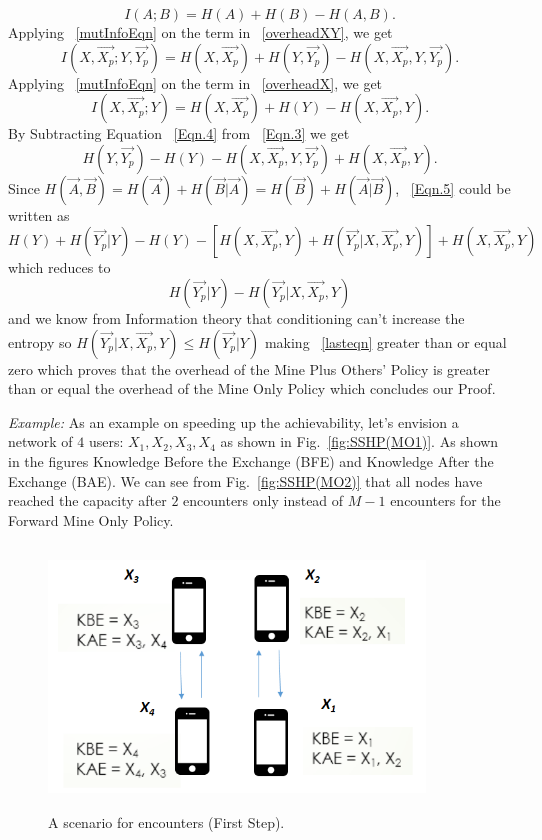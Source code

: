 \documentclass[11pt]{article}
\begin{document}
\begin{itemize}
\begin{equation} 
I(A;B)=H(A) + H(B) - H(A,B).
\label{mutInfoEqn}
\end{equation}
Applying ~\eqref{mutInfoEqn} on the term in ~\eqref{overheadXY}, we get
\begin{equation}
I(X,\vec{X_p};Y,\vec{Y_p})= H(X,\vec{X_p})+H(Y,\vec{Y_p})-H(X,\vec{X_p},Y,\vec{Y_p}).
\label{Eqn.3}
\end{equation}
Applying ~\eqref{mutInfoEqn} on the term in ~\eqref{overheadX}, we get
\begin{equation}
I(X,\vec{X_p};Y)= H(X,\vec{X_p})+H(Y)-H(X,\vec{X_p},Y).
\label{Eqn.4}
\end{equation}
By Subtracting Equation ~\eqref{Eqn.4} from ~\eqref{Eqn.3} we get 
\begin{equation}
H(Y,\vec{Y_p})-H(Y)-H(X,\vec{X_p},Y,\vec{Y_p})+H(X,\vec{X_p},Y).
\label{Eqn.5}
\end{equation}
Since $H(\vec{A},\vec{B}) = H(\vec{A}) + H(\vec{B}|\vec{A}) = H(\vec{B}) + H(\vec{A}|\vec{B}) $, ~\eqref{Eqn.5} could be written as
\begin{equation}
H(Y)+H(\vec{Y_p}|Y)-H(Y)-[H(X,\vec{X_p},Y) + H(\vec{Y_p}|X,\vec{X_p},Y)] + H(X,\vec{X_p},Y)
\end{equation}
which reduces to 
\begin{equation}
H(\vec{Y_p}|Y)- H(\vec{Y_p}|X,\vec{X_p},Y)
\label{lasteqn}
\end{equation}
and we know from Information theory that conditioning can't increase the entropy so $H(\vec{Y_p}|X,\vec{X_p},Y) \leq H(\vec{Y_p}|Y)$ making ~\eqref{lasteqn} greater than or equal zero which proves that the overhead of the Mine Plus Others' Policy is greater than or equal the overhead of the Mine Only Policy which concludes our Proof.

\end{itemize}
\textit{Example: }As an example on speeding up the achievability, let's envision a network of $4$ users: $X_1, X_2, X_3, X_4$ as shown in Fig.~\ref{fig:SSHP(MO1)}. As shown in the figures Knowledge Before the Exchange (BFE) and Knowledge After the Exchange (BAE). We can see from Fig.~\ref{fig:SSHP(MO2)} that all nodes have reached the capacity after $2$ encounters only instead of $M-1$ encounters for the Forward Mine Only Policy.
\begin{figure}[!bp]
\centering
    \includegraphics[width=10cm ,height=7cm]{figures_png/SSHP(MO1)}
    \caption{A scenario for encounters (First Step).}\label{fig:SSHP(MO1)}
    \label{SSHP(MO1)}
\end{figure}
\end{document}
